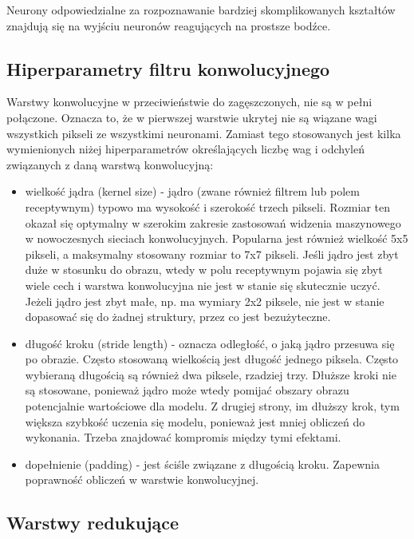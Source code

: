 \documentclass[12pt]{mwbk}
\theoremstyle{plain}
\theoremstyle{definition}
\theoremstyle{remark}
\begin{document}
Neurony odpowiedzialne za rozpoznawanie bardziej skomplikowanych kształtów znajdują się na wyjściu neuronów reagujących na prostsze bodźce.


\subsection{Hiperparametry filtru konwolucyjnego}

\cite{illustrated}

Warstwy konwolucyjne w przeciwieństwie do zagęszczonych, nie są w pełni połączone. Oznacza to, że w pierwszej warstwie ukrytej nie są wiązane wagi wszystkich pikseli ze wszystkimi neuronami. Zamiast tego stosowanych jest kilka wymienionych niżej hiperparametrów określających liczbę wag i odchyleń związanych z daną warstwą konwolucyjną:
\begin{itemize}
	\item wielkość jądra (kernel size) - jądro (zwane również filtrem lub polem receptywnym) typowo ma wysokość i szerokość trzech pikseli. Rozmiar ten okazał się optymalny w szerokim zakresie zastosowań widzenia maszynowego w nowoczesnych sieciach konwolucyjnych. Popularna jest również wielkość 5x5 pikseli, a maksymalny stosowany rozmiar to 7x7 pikseli. Jeśli jądro jest zbyt duże w stosunku do obrazu, wtedy w polu receptywnym pojawia się zbyt wiele cech i warstwa konwolucyjna nie jest w stanie się skutecznie uczyć. Jeżeli jądro jest zbyt małe, np. ma wymiary 2x2 piksele, nie jest w stanie dopasować się do żadnej struktury, przez co jest bezużyteczne.
	
	\item długość kroku (stride length) - oznacza odległość, o jaką jądro przesuwa się po obrazie. Często stosowaną wielkością jest długość jednego piksela. Często wybieraną długością są również dwa piksele, rzadziej trzy. Dłuższe kroki nie są stosowane, ponieważ jądro może wtedy pomijać obszary obrazu potencjalnie wartościowe dla modelu. Z drugiej strony, im dłuższy krok, tym większa szybkość uczenia się modelu, ponieważ jest mniej obliczeń do wykonania. Trzeba znajdować kompromis między tymi efektami.
	
	\item dopełnienie (padding) - jest ściśle związane z długością kroku. Zapewnia poprawność obliczeń w warstwie konwolucyjnej.
	
\end{itemize}	
	
	\subsection{Warstwy redukujące}
	
\end{document}
